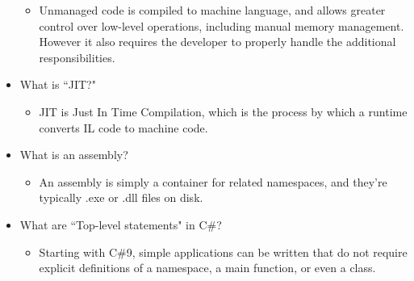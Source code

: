 \documentclass{article}
\begin{document}
\begin{itemize}
\begin{itemize}
        \item Unmanaged code is compiled to machine language, and allows greater control over low-level operations, including manual memory management. However it also requires the developer to properly handle the additional responsibilities.
    \end{itemize}
    \item What is ``JIT?"
    \begin{itemize}
        \item JIT is Just In Time Compilation, which is the process by which a runtime converts IL code to machine code.
    \end{itemize}
    \item What is an assembly?
    \begin{itemize}
        \item An assembly is simply a container for related namespaces, and they're typically .exe or .dll files on disk.
    \end{itemize}
    \item What are ``Top-level statements" in C\#?
    \begin{itemize}
        \item Starting with C\#9, simple applications can be written that do not require explicit definitions of a namespace, a main function, or even a class.
    \end{itemize}
\end{itemize}
\end{document}
